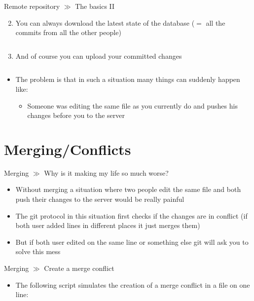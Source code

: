 \documentclass[10pt]{beamer}
\begin{document}
\begin{frame}{Remote repository $\gg$ The basics II}
\begin{enumerate}\setcounter{enumi}{1}
	\item You can always download the latest state of the database ($=$ all the commits from all the other people) \\
	\inputminted[bgcolor=lightGreyCustom,fontsize=\scriptsize]{sh}{./resources/git_remote_repository_02_pull.sh}
	\item And of course you can upload your committed changes \\
	\inputminted[bgcolor=lightGreyCustom,fontsize=\scriptsize]{sh}{./resources/git_remote_repository_02_push.sh}
\end{enumerate}
\begin{itemize}
	\item The problem is that in such a situation many things can suddenly happen like:
	\begin{itemize}
		\item Someone was editing the same file as you currently do and pushes his changes before you to the server
	\end{itemize}
\end{itemize}
\end{frame}

\section{Merging/Conflicts}

\begin{frame}{Merging $\gg$ Why is it making my life so much worse?}
\begin{itemize}
	\item Without merging a situation where two people edit the same file and both push their changes to the server would be really painful
	\item The git protocol in this situation first checks if the changes are in conflict (if both user added lines in different places it just merges them)
	\item But if both user edited on the same line or something else git will ask you to solve this mess
\end{itemize}
\end{frame}

\begin{frame}{Merging $\gg$ Create a merge conflict}
\begin{itemize}
	\item The following script simulates the creation of a merge conflict in a file on one line:
	\href{https://jonathanmh.com/how-to-create-a-git-merge-conflict/}{} 
	\inputminted[bgcolor=lightGreyCustom,fontsize=\scriptsize]{sh}{./resources/git_merging_03_create_conflict.sh}
\end{itemize}
\end{frame}
\end{document}
